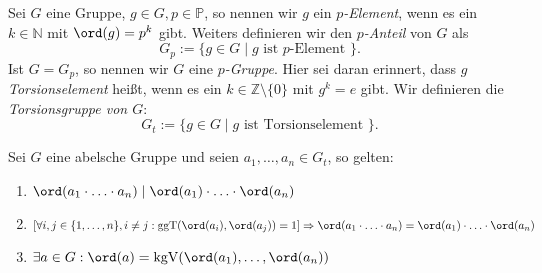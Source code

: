 \begin{definition}
    Sei $G$ eine Gruppe, $g \in G, p \in \mathbb{P}$, so nennen wir $g$ ein \emph{$p$-Element}, wenn es ein $k \in \mathbb{N}$ mit $\ord(g) = p^k$ gibt. Weiters definieren wir den \emph{$p$-Anteil} von $G$ als
    $$ G_p := \{ g \in G \mid g \textrm{ ist $p$-Element } \}. $$
    Ist $G=G_p$, so nennen wir $G$ eine \emph{$p$-Gruppe}. Hier sei daran erinnert, dass $g$ \emph{Torsionselement} heißt, wenn es ein $k \in \mathbb{Z} \setminus \{ 0 \}$ mit $g^k = e$ gibt. Wir definieren die \emph{Torsionsgruppe von $G$}:
    $$ G_t := \{ g \in G \mid g \textrm{ ist Torsionselement } \}. $$
\end{definition}

\begin{lemma} \label{lemma:abelsch-torsion-lemma}
    Sei $G$ eine abelsche Gruppe und seien $a_1, \hdots, a_n \in G_t$, so gelten:
    \begin{enumerate}
        \item $ \ord(a_1 \cdot \hdots \cdot a_n) \mid \ord(a_1) \cdot \hdots \cdot \ord(a_n) $\label{item:lemma:abelsch-torsion-lemma-1}
        \item $ \left[\forall i, j \in \{ 1, \hdots, n \}, i \neq j: \mathrm{ggT}(\ord(a_i), \ord(a_j)) = 1\right] \Rightarrow \ord(a_1 \cdot \hdots \cdot a_n) = \ord(a_1) \cdot \hdots \cdot \ord(a_n) $\label{item:lemma:abelsch-torsion-lemma-2}
        \item $ \exists a \in G: \ord(a) = \mathrm{kgV}(\ord(a_1), \hdots, \ord(a_n)) $
    \end{enumerate}
\end{lemma}

